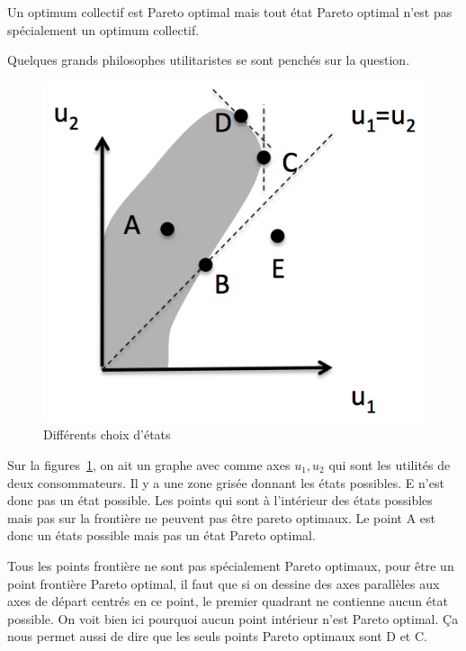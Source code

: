 Un optimum collectif est Pareto optimal mais tout état Pareto optimal
n'est pas spécialement un optimum collectif.

Quelques grands philosophes utilitaristes se sont penchés sur la question.
\begin{figure}
  \centering
  \includegraphics{pareto.png}
  \caption{Différents choix d'états}
  \label{fig:pareto}
\end{figure}
Sur la figures~\ref{fig:pareto},
on ait un graphe avec comme axes $u_1,u_2$ qui sont les
utilités de deux consommateurs.
Il y a une zone grisée donnant les états possibles.
E n'est donc pas un état possible.
Les points qui sont à l'intérieur des états possibles mais pas sur
la frontière ne peuvent pas être pareto optimaux.
Le point A est donc un états possible mais pas un état Pareto optimal.

Tous les points frontière ne sont pas spécialement Pareto optimaux,
pour être un point frontière Pareto optimal,
il faut que si on dessine des axes parallèles aux axes de départ
centrés en ce point, le premier quadrant ne contienne aucun état possible.
On voit bien ici pourquoi aucun point intérieur n'est Pareto optimal.
Ça nous permet aussi de dire que les seuls points Pareto optimaux sont
D et C.

